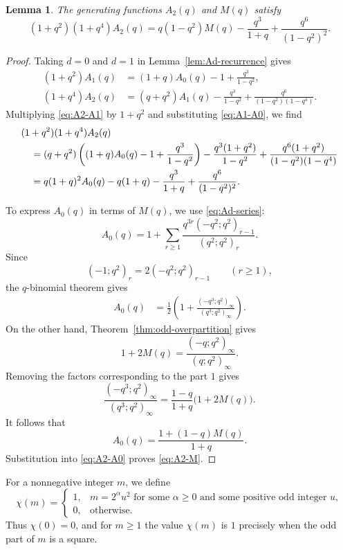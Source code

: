 \documentclass[11pt]{article}
\newtheorem{lemma}[theorem]{Lemma}
\theoremstyle{definition}
\theoremstyle{remark}
\begin{document}
\begin{lemma}\label{lem:A2-M}
The generating functions $A_2(q)$ and $M(q)$ satisfy
\begin{equation}\label{eq:A2-M}
 (1+q^2)(1+q^4)A_2(q)
 =q(1-q^2)M(q)-\frac{q^3}{1+q}
 +\frac{q^6}{(1-q^2)^2}.
\end{equation}
\end{lemma}

\begin{proof}
Taking $d=0$ and $d=1$ in Lemma~\ref{lem:Ad-recurrence} gives
\begin{align}
 (1+q^2)A_1(q)
 &=(1+q)A_0(q)-1+\frac{q^3}{1-q^2},
 \label{eq:A1-A0}\\
 (1+q^4)A_2(q)
 &=(q+q^2)A_1(q)-\frac{q^3}{1-q^2}
 +\frac{q^6}{(1-q^2)(1-q^4)}.
 \label{eq:A2-A1}
\end{align}
Multiplying \eqref{eq:A2-A1} by $1+q^2$ and substituting \eqref{eq:A1-A0}, we find
\begin{align}
 &(1+q^2)(1+q^4)A_2(q)\notag\\
 &\quad=(q+q^2)
 \left((1+q)A_0(q)-1+\frac{q^3}{1-q^2}\right)
 -\frac{q^3(1+q^2)}{1-q^2}
 +\frac{q^6(1+q^2)}{(1-q^2)(1-q^4)}\notag\\
 &\quad=q(1+q)^2A_0(q)-q(1+q)
 -\frac{q^3}{1+q}+\frac{q^6}{(1-q^2)^2}.
 \label{eq:A2-A0}
\end{align}

To express $A_0(q)$ in terms of $M(q)$, we use \eqref{eq:Ad-series}:
\[
 A_0(q)=1+\sum_{r\geq1}
 \frac{q^{3r}(-q^2;q^2)_{r-1}}{(q^2;q^2)_r}.
\]
Since
\[
 (-1;q^2)_r=2(-q^2;q^2)_{r-1}\qquad(r\geq1),
\]
the $q$-binomial theorem gives
\begin{align*}
 A_0(q)
 &=\frac12\left(
 1+\frac{(-q^3;q^2)_\infty}{(q^3;q^2)_\infty}
 \right).
\end{align*}
On the other hand, Theorem~\ref{thm:odd-overpartition} gives
\[
 1+2M(q)=\frac{(-q;q^2)_\infty}{(q;q^2)_\infty}.
\]
Removing the factors corresponding to the part $1$ gives
\[
 \frac{(-q^3;q^2)_\infty}{(q^3;q^2)_\infty}
 =\frac{1-q}{1+q}\bigl(1+2M(q)\bigr).
\]
It follows that
\[
 A_0(q)=\frac{1+(1-q)M(q)}{1+q}.
\]
Substitution into \eqref{eq:A2-A0} proves \eqref{eq:A2-M}.
\end{proof}

For a nonnegative integer $m$, we define
\[
 \chi(m)=
 \begin{cases}
 1,&m=2^\alpha u^2\text{ for some }\alpha\geq0
       \text{ and some positive odd integer }u,\\
 0,&\text{otherwise}.
 \end{cases}
\]
Thus $\chi(0)=0$, and for $m\geq1$ the value $\chi(m)$ is $1$ precisely when the odd part of $m$ is a square.
\end{document}

